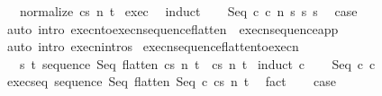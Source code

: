 \begin{isabellebody}
\ \ \ {\isachardoublequoteopen}{\isasymGamma}{\isasymturnstile}{\isasymlangle}normalize\ c{\isacharcomma}s{\isasymrangle}\ {\isacharequal}n{\isasymRightarrow}\ t{\isachardoublequoteclose}\isanewline
%
\isadelimproof
%
\endisadelimproof
%
\isatagproof
{}\isamarkupfalse%
\ exec\ \isanewline
{}\isamarkupfalse%
\ induct\isanewline
\ \ \isamarkupfalse%
\ {\isacharparenleft}Seq\ c{}\ c{}\ n\ s\ s{\isacharprime}\ s{\isacharprime}{\isacharprime}{\isacharparenright}\ \isamarkupfalse%
\ {\isacharquery}case\isanewline
\ \ \ \ \isamarkupfalse%
\ {\isacharparenleft}auto\ intro{\isacharcolon}\ execn{\isacharunderscore}to{\isacharunderscore}execn{\isacharunderscore}sequence{\isacharunderscore}flatten\ \ execn{\isacharunderscore}sequence{\isacharunderscore}app\ {\isacharparenright}\isanewline
{}\isamarkupfalse%
\ {\isacharparenleft}auto\ intro{\isacharcolon}\ execn{\isachardot}intros{\isacharparenright}%
\endisatagproof
{\isafoldproof}%
%
\isadelimproof
\isanewline
%
\endisadelimproof
\isanewline
\isanewline
\isanewline
{}\isamarkupfalse%
\ execn{\isacharunderscore}sequence{\isacharunderscore}flatten{\isacharunderscore}to{\isacharunderscore}execn{\isacharcolon}\ \isanewline
\ \ \ {\isachardoublequoteopen}{\isasymAnd}s\ t{\isachardot}\ {\isasymGamma}{\isasymturnstile}{\isasymlangle}sequence\ Seq\ {\isacharparenleft}flatten\ c{\isacharparenright}{\isacharcomma}s{\isasymrangle}\ {\isacharequal}n{\isasymRightarrow}\ t\ {\isasymLongrightarrow}\ {\isasymGamma}{\isasymturnstile}{\isasymlangle}c{\isacharcomma}s{\isasymrangle}\ {\isacharequal}n{\isasymRightarrow}\ t{\isachardoublequoteclose}\isanewline
%
\isadelimproof
%
\endisadelimproof
%
\isatagproof
{}\isamarkupfalse%
\ {\isacharparenleft}induct\ c{\isacharparenright}\isanewline
\ \ \isamarkupfalse%
\ {\isacharparenleft}Seq\ c{}\ c{}{\isacharparenright}\isanewline
\ \ \isamarkupfalse%
\ exec{\isacharunderscore}seq{\isacharcolon}\ {\isachardoublequoteopen}{\isasymGamma}{\isasymturnstile}{\isasymlangle}sequence\ Seq\ {\isacharparenleft}flatten\ {\isacharparenleft}Seq\ c{}\ c{}{\isacharparenright}{\isacharparenright}{\isacharcomma}s{\isasymrangle}\ {\isacharequal}n{\isasymRightarrow}\ t{\isachardoublequoteclose}\ \isamarkupfalse%
\ fact\isanewline
\ \ \isamarkupfalse%
\ {\isacharquery}case\isanewline
\ \ \isamarkupfalse%

\end{isabellebody}
